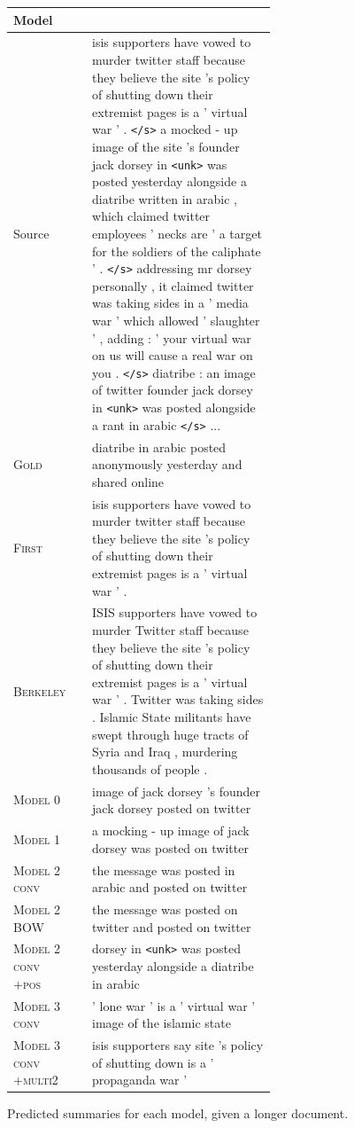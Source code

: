 \documentclass[12pt]{report}
\begin{document}
\begin{figure}[p]
\centering
\begin{tabular}{ll p{0.7\linewidth}}
\toprule
Model & & \\
\midrule
Source & & isis supporters have vowed to murder twitter staff because they believe the site 's policy of shutting down their extremist pages is a ' virtual
war ' . \texttt{</s>} a mocked - up image of the site 's founder jack dorsey in \texttt{<unk>} was posted yesterday alongside a diatribe written in arabic , which claimed twitter employees ' necks
 are ' a target for the soldiers of the caliphate ' . \texttt{</s>} addressing mr dorsey personally , it claimed twitter was taking sides in a ' media war ' which allowed ' slaughter ' ,
adding : ' your virtual war on us will cause a real war on you . \texttt{</s>} diatribe : an image of twitter founder jack dorsey in \texttt{<unk>} was posted alongside a rant in arabic \texttt{</s>} ... \\
\midrule
\textsc{Gold} & & diatribe in arabic posted anonymously yesterday and shared online \\
\midrule
\textsc{First} & &  isis supporters have vowed to murder twitter staff because they believe the site 's policy of shutting down their extremist pages is a ' virtual
war ' . \\
 \midrule
\textsc{Berkeley} & & ISIS supporters have vowed to murder Twitter staff because they believe the site 's policy of shutting down their extremist pages is a ' virtual war ' .
Twitter was taking sides .
Islamic State militants have swept through huge tracts of Syria and Iraq , murdering thousands of people .\\
\midrule

\textsc{Model 0} & & image of jack dorsey 's founder jack dorsey posted on twitter \\
\midrule
 \textsc{Model 1} & & a mocking - up image of jack dorsey was posted on twitter \\
\midrule
\textsc{Model 2 conv} & & the message was posted in arabic and posted on twitter \\
\textsc{Model 2 BOW} & &  the message was posted on twitter and posted on twitter \\
\textsc{Model 2 conv +pos} & & dorsey in \texttt{<unk>} was posted yesterday alongside a diatribe in arabic \\
\midrule
\textsc{Model 3 conv} & & ' lone war ' is a ' virtual war ' image of the islamic state \\
\textsc{Model 3 conv +multi2} & &  isis supporters say site 's policy of shutting down is a ' propaganda war ' \\
\bottomrule
\end{tabular}
\caption{Predicted summaries for each model, given a longer document.}
\label{fig:predicted_summaries2}
\end{figure}
\end{document}
